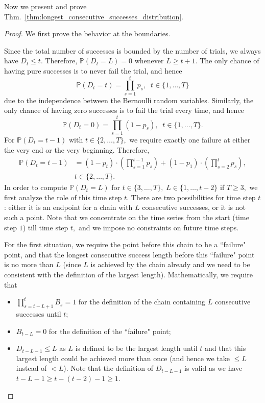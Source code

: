 \documentclass{article}
\theoremstyle{plain}
\theoremstyle{definition}
\theoremstyle{remark}
\begin{document}
Now we present and prove Thm.~\ref{thm:longest_consecutive_successes_distribution}.

\begin{proof}
We first prove the behavior at the boundaries.

Since the total number of successes is bounded by the number of trials, we always have $D_t\leq t.$ Therefore, $\mathbb{P}(D_t=L)=0$ whenever $L\geq t+1.$ The only chance of having pure successes is to never fail the trial, and hence $$\mathbb{P}(D_t=t) =\prod_{s=1}^t p_s, \;\; t\in\{1, \dots, T\}$$ due to the independence between the Bernoulli random variables. Similarly, the only chance of having zero successes is to fail the trial every time, and hence $$\mathbb{P}(D_t=0) =\prod_{s=1}^t(1-p_s), \;\; t\in\{1, \dots, T\}.$$ 
For $\mathbb{P}(D_t=t-1)$ with $t\in\{2, \dots, T\},$ we require exactly one failure at either the very end or the very beginning. Therefore, 
\begin{align*}\mathbb{P}(D_t=t-1)&=(1-p_t)\cdot\left(\prod_{s=1}^{t-1} p_s\right)+(1-p_1)\cdot\left(\prod_{s=2}^{t} p_s\right),\\& t\in\{2, \dots, T\}.\end{align*}
In order to compute $\mathbb{P}(D_t=L)$ for $t\in\{3, \dots, T\},\;L\in\{1, \dots, t-2\}$ if $T\geq 3,$ we first analyze the role of this time step $t$. There are two possibilities for time step $t$: either it is an endpoint for a chain with $L$ consecutive successes, or it is not such a point. Note that we concentrate on the time series from the start (time step $1$) till time step $t,$ and we impose no constraints on future time steps.


For the first situation, we require the point before this chain to be a ``failure" point, and that the longest consecutive success length before this ``failure" point is no more than $L$ (since $L$ is achieved by the chain already and we need to be consistent with the definition of the largest length). Mathematically, we require that 
\begin{itemize}
    \item $\prod_{s=t-L+1}^tB_s=1$ for the definition of the chain containing $L$ consecutive successes until $t$; 
    \item $B_{t-L}=0$ for the definition of the ``failure" point;
    \item $D_{t-L-1}\leq L$ as $L$ is defined to be the largest length until $t$ and that this largest length could be achieved more than once (and hence we take $\leq L$ instead of $< L$). Note that the definition of $D_{t-L-1}$ is valid as we have $t-L-1\geq t-(t-2) - 1 \geq 1.$ 
\end{itemize}


\end{proof}
\end{document}
